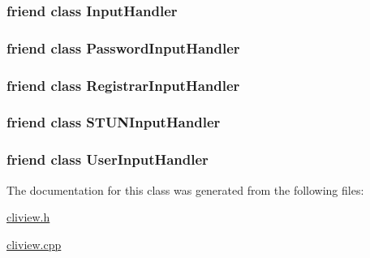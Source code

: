 \hypertarget{classCLIView_28c677eee06763681231ba62273b9fad}{
\subsubsection[{InputHandler}]{\setlength{\rightskip}{0pt plus 5cm}friend class InputHandler}}
\label{classCLIView_28c677eee06763681231ba62273b9fad}


\hypertarget{classCLIView_3351b3e1913bdd8c10a93b404ae26108}{
\subsubsection[{PasswordInputHandler}]{\setlength{\rightskip}{0pt plus 5cm}friend class PasswordInputHandler}}
\label{classCLIView_3351b3e1913bdd8c10a93b404ae26108}


\hypertarget{classCLIView_b160fef2c62aedd8169bf5670f1f291c}{
\subsubsection[{RegistrarInputHandler}]{\setlength{\rightskip}{0pt plus 5cm}friend class RegistrarInputHandler}}
\label{classCLIView_b160fef2c62aedd8169bf5670f1f291c}


\hypertarget{classCLIView_f9b3716dfe24382734846514b4626d04}{
\subsubsection[{STUNInputHandler}]{\setlength{\rightskip}{0pt plus 5cm}friend class STUNInputHandler}}
\label{classCLIView_f9b3716dfe24382734846514b4626d04}


\hypertarget{classCLIView_17c53d72a733c0a2f0cc2103459d5aec}{
\subsubsection[{UserInputHandler}]{\setlength{\rightskip}{0pt plus 5cm}friend class UserInputHandler}}
\label{classCLIView_17c53d72a733c0a2f0cc2103459d5aec}




The documentation for this class was generated from the following files:\begin{CompactItemize}
\item 
\hyperlink{cliview_8h}{cliview.h}\item 
\hyperlink{cliview_8cpp}{cliview.cpp}\end{CompactItemize}
